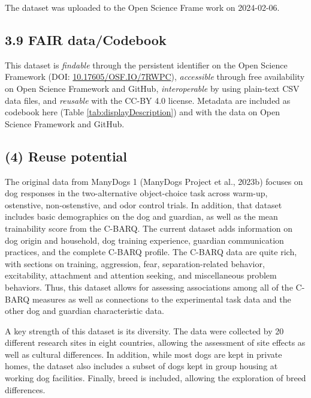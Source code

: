 \documentclass[
  man,floatsintext]{apa6}
\begin{document}
The dataset was uploaded to the Open Science Frame work on 2024-02-06.

\hypertarget{fair-datacodebook}{%
\subsection{3.9 FAIR data/Codebook}\label{fair-datacodebook}}

This dataset is \emph{findable} through the persistent identifier on the Open Science Framework (DOI: \href{https://doi.org/10.17605/OSF.IO/7RWPC}{10.17605/OSF.IO/7RWPC}), \emph{accessible} through free availability on Open Science Framework and GitHub, \emph{interoperable} by using plain-text CSV data files, and \emph{reusable} with the CC-BY 4.0 license. Metadata are included as codebook here (Table \ref{tab:displayDescription}) and with the data on Open Science Framework and GitHub.

\hypertarget{reuse-potential}{%
\subsection{(4) Reuse potential}\label{reuse-potential}}

The original data from ManyDogs 1 (ManyDogs Project et al., 2023b) focuses on dog responses in the two-alternative object-choice task across warm-up, ostenstive, non-ostenstive, and odor control trials. In addition, that dataset includes basic demographics on the dog and guardian, as well as the mean trainability score from the C-BARQ. The current dataset adds information on dog origin and household, dog training experience, guardian communication practices, and the complete C-BARQ profile. The C-BARQ data are quite rich, with sections on training, aggression, fear, separation-related behavior, excitability, attachment and attention seeking, and miscellaneous problem behaviors. Thus, this dataset allows for assessing associations among all of the C-BARQ measures as well as connections to the experimental task data and the other dog and guardian characteristic data.

A key strength of this dataset is its diversity. The data were collected by 20 different research sites in eight countries, allowing the assessment of site effects as well as cultural differences. In addition, while most dogs are kept in private homes, the dataset also includes a subset of dogs kept in group housing at working dog facilities. Finally, breed is included, allowing the exploration of breed differences.
\end{document}
